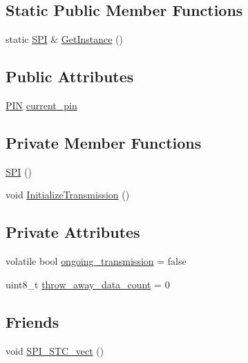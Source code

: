 \subsection*{Static Public Member Functions}
\begin{DoxyCompactItemize}
\item 
static \hyperlink{class_s_p_i_1_1_s_p_i}{S\+PI} \& \hyperlink{class_s_p_i_1_1_s_p_i_aeb00a468750e8f183eeaca0d0ffaf9f3}{Get\+Instance} ()
\end{DoxyCompactItemize}
\subsection*{Public Attributes}
\begin{DoxyCompactItemize}
\item 
\hyperlink{struct_s_p_i_1_1_p_i_n}{P\+IN} \hyperlink{class_s_p_i_1_1_s_p_i_a3dc3f87f8ee3f3b5776e21fc4b72efbc}{current\+\_\+pin}
\end{DoxyCompactItemize}
\subsection*{Private Member Functions}
\begin{DoxyCompactItemize}
\item 
\hyperlink{class_s_p_i_1_1_s_p_i_ac1ee59045bad0aa3dc8574519b0f6ed9}{S\+PI} ()
\item 
void \hyperlink{class_s_p_i_1_1_s_p_i_af7228363cbb82ca2faa8ef29a1819d31}{Initialize\+Transmission} ()
\end{DoxyCompactItemize}
\subsection*{Private Attributes}
\begin{DoxyCompactItemize}
\item 
volatile bool \hyperlink{class_s_p_i_1_1_s_p_i_a965dfd15d040742db8fc022535e95a61}{ongoing\+\_\+transmission} = false
\item 
uint8\+\_\+t \hyperlink{class_s_p_i_1_1_s_p_i_a997d2f4abbb126ec00ba3a4abe2940ac}{throw\+\_\+away\+\_\+data\+\_\+count} = 0
\end{DoxyCompactItemize}
\subsection*{Friends}
\begin{DoxyCompactItemize}
\item 
void \hyperlink{class_s_p_i_1_1_s_p_i_a96543550133e0b0c6ae83faad5c0d68d}{S\+P\+I\+\_\+\+S\+T\+C\+\_\+vect} ()
\end{DoxyCompactItemize}

